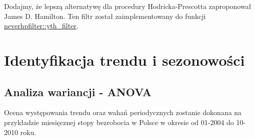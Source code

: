 \documentclass[polish,]{book}
\begin{document}
Dodajmy, że lepszą alternatywę dla procedury Hodricka-Prescotta zaproponował James D. Hamilton. Ten filtr został zaimplementowany do funkcji \href{https://rdrr.io/cran/neverhpfilter/man/yth_filter.html}{neverhpfilter::yth\_filter}.

\hypertarget{part_72}{%
\section{Identyfikacja trendu i sezonowości}\label{part_72}}

\hypertarget{part_721}{%
\subsection{Analiza wariancji - ANOVA}\label{part_721}}

Ocena występowania trendu oraz wahań periodycznych zostanie dokonana na przykładzie miesięcznej stopy bezrobocia w Polsce w okresie od 01-2004 do 10-2010 roku.
\end{document}
